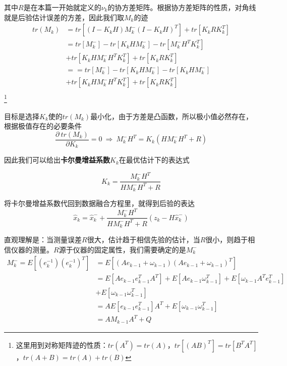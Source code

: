 其中$R$是在本篇一开始就定义的$\nu_k$的协方差矩阵。根据协方差矩阵的性质，对角线就是后验估计误差的方差，因此我们取$M_k$的迹
\begin{equation}
    \begin{aligned}
        tr(M_k)&=tr[(I-K_kH)M^{-}_k(I-K_kH)^T]+tr[K_kRK_k^T]\\
        &=tr[M^{-}_k]-tr[K_kHM^{-}_k]-tr[M^{-}_kH^TK_k^T]\\
        &+tr[K_kHM^{-}_kH^TK^T_k]+tr[K_kRK_k^T]\\
        &==tr[M^{-}_k]-tr[K_kHM^{-}_k]-tr[K_kHM^{-}_k]\\
        &+tr[K_kHM^{-}_kH^TK^T_k]+tr[K_kRK_k^T]\\
    \end{aligned}
\end{equation}\footnote{这里用到对称矩阵迹的性质：$tr(A^T)=tr(A)$，$tr[(AB)^T]=tr[B^TA^T]$，$tr(A+B)=tr(A)+tr(B)$}

目标是选择$K_k$使的$tr(M_k)$最小化，由于方差是凸函数，所以极小值必然存在，根据极值存在的必要条件
\begin{equation}
    \frac{\partial\  tr(M_k)}{\partial K_k}=0\ \Rightarrow\ M_k^{-}H^T=K_k(HM^{-}_kH^T+R)
\end{equation}

因此我们可以给出\textbf{卡尔曼增益系数$K_k$}在最优估计下的表达式
\begin{framed}
    \begin{equation}
       K_k=\frac{M_k^{-}H^T}{HM^{-}_kH^T+R}
    \end{equation}
\end{framed}

将卡尔曼增益系数代回到数据融合方程里，就得到后验的表达
\begin{equation}
    \hat{x}_k=\hat{x}^{-}_k+\frac{M_k^{-}H^T}{HM^{-}_kH^T+R}(z_k-H\hat{x}^{-}_k)
\end{equation}

直观理解是：当测量误差$R$很大，估计趋于相信先验的估计，当$R$很小，则趋于相信仪器的测量。$R$源于仪器的固定属性，我们需要确定的是$M^{-}_k$
\begin{equation}
    \begin{aligned}
        M^{-}_k=E[(e^{-1}_k)(e^{-1}_k)^T]&=E[(Ae_{k-1}+\omega_{k-1})(Ae_{k-1}+\omega_{k-1})^T]\\
        &=E[Ae_{k-1}e^T_{k-1}A^T]+E[Ae_{k-1}\omega^T_{k-1}]+E[\omega_{k-1}A^Te^T_{k-1}]\\
        &+E[\omega_{k-1}\omega^T_{k-1}]\\
        & =AE[e_{k-1}e^T_{k-1}]A^T+E[\omega_{k-1}\omega^T_{k-1}]\\
        &=AM_{k-1}A^T+Q
    \end{aligned}
\end{equation}


